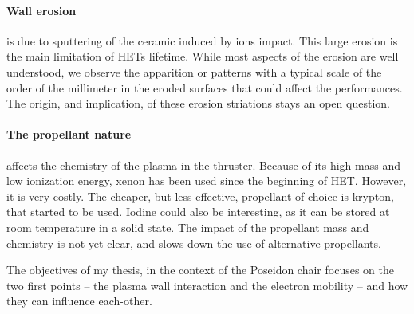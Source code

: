 \paragraph{Wall erosion} is due to sputtering of the ceramic induced by ions impact.
This large erosion is the main limitation of \ac{HET}s lifetime.
While most aspects of the erosion are well understood, we observe the apparition or  patterns with a typical scale of the order of the millimeter in the eroded surfaces that could affect the performances.
The origin, and implication, of these erosion striations stays an open question.

\paragraph{The propellant nature} affects the chemistry of the plasma in the thruster.
Because of its high mass and low ionization energy, xenon has been used since the beginning of \ac{HET}. 
However, it is very costly.
The cheaper, but less effective, propellant of choice is krypton, that started to be used.
Iodine could also be interesting, as it can be stored at room temperature in a solid state.
The impact of the propellant mass and chemistry is not yet clear, and slows down the use of alternative propellants.

\vspace{1em}
The objectives of my thesis, in the context of the {\sc Poseidon} chair focuses on the two first points -- the plasma wall interaction and the electron mobility -- and how they can influence each-other.





